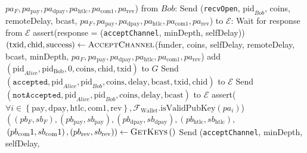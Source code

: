 \begin{algorithmic}[1]
    \Indent
      \Indent
        \State $pa_F, pa_{\mathrm{pay}}, pa_{\mathrm{dpay}}, pa_{\mathrm{htlc}},
        pa_{\mathrm{com}1}, pa_{\mathrm{rev}}$) from $Bob$:
      \EndIndent
    \EndIndent
    \Indent
      \State Send (\texttt{recvOpen}, $\mathrm{pid}_{Bob}$, coins, remoteDelay,
      bcast,
      \Indent
        \Indent
          \State $pa_F, pa_{\mathrm{pay}}, pa_{\mathrm{dpay}},
          pa_{\mathrm{htlc}}, pa_{\mathrm{com}1}, pa_{\mathrm{rev}}$) to
          $\mathcal{E}$:
        \EndIndent
      \EndIndent
      \State Wait for response from $\mathcal{E}$
      \State assert(response = (\texttt{acceptChannel}, minDepth, selfDelay))
      \State $\left(\mathrm{txid}, \mathrm{chid}, \mathrm{success}\right) \gets
      \textsc{AcceptChannel}$(funder, coins, selfDelay,
      \Indent
        \Indent
          \State remoteDelay, bcast, minDepth,
          \State $pa_F, pa_{\mathrm{pay}}, pa_{\mathrm{dpay}},
          pa_{\mathrm{htlc}}, pa_{\mathrm{com}1}, pa_{\mathrm{rev}}$)
        \EndIndent
      \EndIndent
        \State add $\left(\mathrm{pid}_{Alice}, \mathrm{pid_{Bob}}, 0,
        \mathrm{coins}, \mathrm{chid}, \mathrm{txid}\right)$ to $G$
        \State Send $\left(\mathtt{accepted}, \mathrm{pid}_{Alice},
        \mathrm{pid}_{Bob}, \mathrm{coins}, \mathrm{delay}, \mathrm{bcast},
        \mathrm{txid}, \mathrm{chid}\right)$
        \Indent
          \Indent
            \State to $\mathcal{E}$
          \EndIndent
        \EndIndent
      \Else
        \State Send $\left(\mathtt{notAccepted}, \mathrm{pid}_{Alice},
        \mathrm{pid}_{Bob}, \mathrm{coins}, \mathrm{delay},
        \mathrm{bcast}\right)$ to $\mathcal{E}$
      \EndIf
    \EndIndent
    \State
      \State assert($\forall i \in \left\{\mathrm{pay}, \mathrm{dpay},
      \mathrm{htlc}, \mathrm{com}1, \mathrm{rev}\right\},
      \mathcal{F}_{\mathrm{Wallet}}.\mathrm{isValidPubKey}\left(pa_i\right)$)
      \State $\left(\left(pb_F, sb_F\right), \left(pb_\mathrm{pay},
      sb_\mathrm{pay}\right), \left(pb_\mathrm{dpay}, sb_\mathrm{dpay}\right),
      \left(pb_\mathrm{htlc}, sb_\mathrm{htlc}\right),\right.$
      \State $\left.\left(pb_\mathrm{com}1, sb_\mathrm{com}1\right),
      \left(pb_\mathrm{rev}, sb_\mathrm{rev}\right)\right) \gets
      \textsc{GetKeys}\left(\right)$
      \State Send (\texttt{acceptChannel}, minDepth, selfDelay,

\end{algorithmic}
